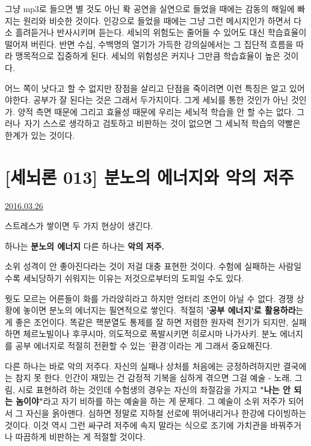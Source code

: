 그냥 mp3로 들으면 별 것도 아닌 롹 공연을 실연으로 들었을 때에는 감동의 해일에 빠지는 원리와 비슷한 것이다.
인강으로 들었을 때에는 그냥 그런 메시지인가 하면서 다소 흘려듣거나 반사시키며 듣는다.
세뇌의 위험도는 줄어들 수 있어도 대신 학습효율이 떨어져 버린다.
반면 수십, 수백명의 열기가 가득한 강의실에서는 그 집단적 흐름을 따라 맹목적으로 집중하게 된다.
세뇌의 위험성은 커지나 그만큼 학습효율이 높은 것이다.
\vspace{5mm}

어느 쪽이 낫다고 할 수 없지만 장점을 살리고 단점을 죽이려면 이런 특징은 알고 있어야한다.
공부가 잘 된다는 것은 그래서 두가지이다. 그게 세뇌를 통한 것인가 아닌 것인가.
양적 측면 때문에 그리고 효율성 때문에 우리는 세뇌적 학습을 안 할 수는 없다.
그러나 자기 스스로 생각하고 검토하고 비판하는 것이 없으면 그 세뇌적 학습의 약빨은 한계가 있는 것이다.
\vspace{5mm}





\section{[세뇌론 013] 분노의 에너지와 악의 저주}
\href{https://www.kockoc.com/Apoc/696312}{2016.03.26}

\vspace{5mm}

스트레스가 쌓이면 두 가지 현상이 생긴다.
\vspace{5mm}

하나는 \textbf{분노의 에너지}
다른 하나는 \textbf{악의} \textbf{저주.}
\vspace{5mm}

소위 성격이 안 좋아진다라는 것이 저걸 대충 표현한 것이다.
수험에 실패하는 사람일수록 세뇌당하기 쉬워지는 이유는 저것으로부터의 도피일 수도 있다.
\vspace{5mm}

뭣도 모르는 어른들이 화를 가라앉히라고 하지만 엉터리 조언이 아닐 수 없다.
경쟁 상황에 놓이면 분노의 에너지는 필연적으로 쌓인다. 적절히 \textbf{'공부 에너지'로 활용하라}는 게 좋은 조언이다.
똑같은 핵분열도 통제를 잘 하면 저렴한 원자력 전기가 되지만, 실패하면 체르노빌이나 후쿠시마, 의도적으로 폭발시키면 히로시마 나가사키.
분노 에너지를 공부 에너지로 적절히 전환할 수 있는 '환경'이라는 게 그래서 중요해진다.
\vspace{5mm}

다른 하나는 바로 악의 저주다. 자신의 실패나 상처를 처음에는 긍정하려하지만 결국에는 참지 못 한다.
인간이 재밌는 건 감정적 기복을 심하게 겪으면 그걸 예술 - 노래, 그림, 시로 표현하려 하는 것인데
수험생의 경우는 자신의 좌절감을 가지고 \textbf{"나는 안 되는 놈이야"}라고 자기 비하를 하는 예술을 하는 게 문제다.
그 예술이 소위 저주가 되어서 그 자신을 옭아맨다. 심하면 정말로 지하철 선로에 뛰어내리거나 한강에 다이빙하는 것이다.
이것 역시 그런 싸구려 저주에 속지 말라는 식으로 조기에 가치관을 바꿔주거나 따끔하게 비판하는 게 적절할 것이다.
\vspace{5mm}

